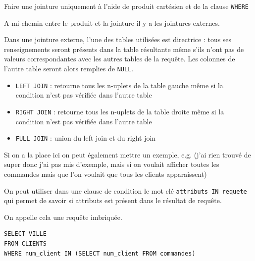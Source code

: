 \begin{exercise}
	Faire une jointure uniquement à l'aide de produit cartésien et de la clause \texttt{WHERE}
\end{exercise}

A mi-chemin entre le produit et la jointure il y a les jointures externes.

\begin{syntaxe}
	Dans une jointure externe, l'une des tables utilisées est directrice : tous ses renseignements seront présents dans la table résultante même s'ils n'ont pas de valeurs correspondantes avec les autres tables de la requête. Les colonnes de l'autre table seront alors remplies de \texttt{NULL}.
	\begin{itemize}
		\item \texttt{LEFT JOIN} : retourne tous les n-uplets de la table gauche même si la condition n'est pas vérifiée dans l'autre table
		\item \texttt{RIGHT JOIN} : retourne tous les n-uplets de la table droite même si la condition n'est pas vérifiée dans l'autre table
		\item \texttt{FULL JOIN} : union du left join et du right join
	\end{itemize}
\end{syntaxe}

\begin{com}
	Si on a la place ici on peut également mettre un exemple, e.g. (j'ai rien trouvé de super donc j'ai pas mis d'exemple, mais si on voulait afficher toutes les commandes mais que l'on voulait que tous les clients apparaissent)
\end{com}

\begin{syntaxe}
	On peut utiliser dans une clause de condition le mot clé \texttt{attributs IN requete} qui permet de savoir si attributs est présent dans le résultat de requête.
\end{syntaxe}

\begin{rem}
	On appelle cela une requête imbriquée.
\end{rem}

\begin{example}
	\begin{lstlisting}
SELECT VILLE
FROM CLIENTS
WHERE num_client IN (SELECT num_client FROM commandes)
	\end{lstlisting}
\end{example}


